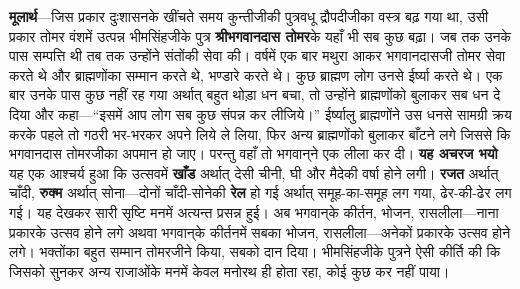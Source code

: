 \begin{sloppypar}\justifying{}
\textbf{मूलार्थ}—जिस प्रकार दुःशासनके खींचते समय कुन्तीजीकी पुत्रवधू द्रौपदीजीका वस्त्र बढ़ गया था, उसी प्रकार तोमर वंशमें उत्पन्न भीमसिंहजीके पुत्र \textbf{श्रीभगवानदास तोमर}के यहाँ भी सब कुछ बढ़ा। जब तक उनके पास सम्पत्ति थी तब तक उन्होंने संतोंकी सेवा की। वर्षमें एक बार मथुरा आकर भगवानदासजी तोमर सेवा करते थे और ब्राह्मणोंका सम्मान करते थे, भण्डारे करते थे। कुछ ब्राह्मण लोग उनसे ईर्ष्या करते थे। एक बार उनके पास कुछ नहीं रह गया अर्थात् बहुत थोड़ा धन बचा, तो उन्होंने ब्राह्मणोंको बुलाकर सब धन दे दिया और कहा—“इसमें आप लोग सब कुछ संपन्न कर लीजिये।” ईर्ष्यालु ब्राह्मणोंने उस धनसे सामग्री क्रय करके पहले तो गठरी भर-भरकर अपने लिये ले लिया, फिर अन्य ब्राह्मणोंको बुलाकर बाँटने लगे जिससे कि भगवानदास तोमरजीका अपमान हो जाए। परन्तु वहाँ तो भगवान्‌ने एक लीला कर दी। \textbf{यह अचरज भयो} यह एक आश्चर्य हुआ कि उत्सवमें \textbf{खाँड} अर्थात् देसी चीनी, घी और मैदेकी वर्षा होने लगी। \textbf{रजत} अर्थात् चाँदी, \textbf{रुक्म} अर्थात् सोना—दोनों चाँदी-सोनेकी \textbf{रेल} हो गई अर्थात् समूह-का-समूह लग गया, ढेर-की-ढेर लग गई। यह देखकर सारी सृष्टि मनमें अत्यन्त प्रसन्न हुई। अब भगवान्‌के कीर्तन, भोजन, रासलीला—नाना प्रकारके उत्सव होने लगे अथवा भगवान्‌के कीर्तनमें सबका भोजन, रासलीला—अनेकों प्रकारके उत्सव होने लगे। भक्तोंका बहुत सम्मान तोमरजीने किया, सबको दान दिया। भीमसिंहजीके पुत्रने ऐसी कीर्ति की कि जिसको सुनकर अन्य राजाओंके मनमें केवल मनोरथ ही होता रहा, कोई कुछ कर नहीं पाया।
\end{sloppypar}


